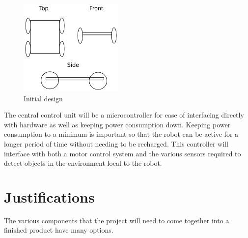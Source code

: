 \begin{figure}[h]
\centering
        \includegraphics[width=2.0in] {Images/initial-design.png}
        \caption{Initial design}
        \label{Initial design}
\end{figure}

The central control unit will be a microcontroller for ease of interfacing directly with hardware as well as keeping power consumption down.  Keeping power consumption to a minimum is important so that the robot can be active for a longer period of time without needing to be recharged.  This controller will interface with both a motor control system and the various sensors required to detect objects in the environment local to the robot.

\section{Justifications}
The various components that the project will need to come together into a finished product have many options.
